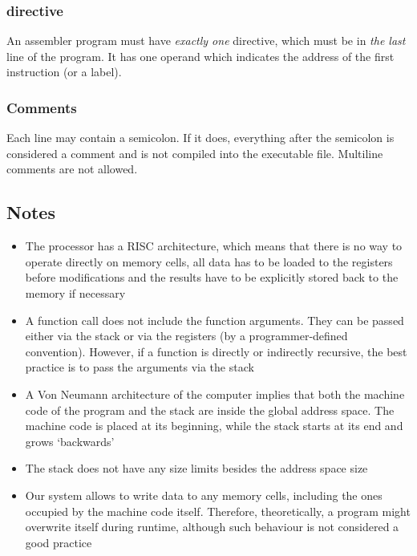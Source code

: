 \subsubsection{ directive}

An assembler program must have \textit{exactly one}  directive, which must be in \textit{the last} line of the program.
It has one operand which indicates the address of the first instruction (or a label).

\subsubsection{Comments}

Each line may contain a semicolon.
If it does, everything after the semicolon is considered a comment and is not compiled into the executable file.
Multiline comments are not allowed.

\vspace{.4in}

\subsection{Notes}

\begin{itemize}
    \item The  processor has a RISC architecture, which means that there is no way to operate directly on memory cells, all data has to be loaded to the registers before modifications and the results have to be explicitly stored back to the memory if necessary
    \item A function call does not include the function arguments.
          They can be passed either via the stack or via the registers (by a programmer-defined convention).
          However, if a function is directly or indirectly recursive, the best practice is to pass the arguments via the stack
    \item A Von Neumann architecture of the  computer implies that both the machine code of the program and the stack are inside the global address space.
          The machine code is placed at its beginning, while the stack starts at its end and grows `backwards'
    \item The stack does not have any size limits besides the address space size
    \item Our system allows to write data to any memory cells, including the ones occupied by the machine code itself.
          Therefore, theoretically, a program might overwrite itself during runtime, although such behaviour is not considered a good practice
\end{itemize}
